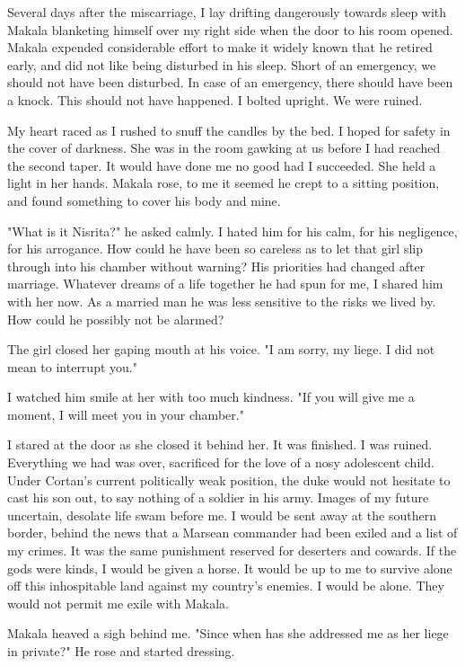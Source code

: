 \documentclass{article}
\begin{document}
Several days after the miscarriage, I lay drifting dangerously towards sleep with Makala blanketing himself over my right side when the door to his room opened. Makala expended considerable effort to make it widely known that he retired early, and did not like being disturbed in his sleep. Short of an emergency, we should not have been disturbed. In case of an emergency, there should have been a knock. This should not have happened. I bolted upright. We were ruined.

My heart raced as I rushed to snuff the candles by the bed. I hoped for safety in the cover of darkness. She was in the room gawking at us before I had reached the second taper. It would have done me no good had I succeeded. She held a light in her hands. Makala rose, to me it seemed he crept to a sitting position, and found something to cover his body and mine.

"What is it Nisrita?" he asked calmly. I hated him for his calm, for his negligence, for his arrogance. How could he have been so careless as to let that girl slip through into his chamber without warning? His priorities had changed after marriage. Whatever dreams of a life together he had spun for me, I shared him with her now. As a married man he was less sensitive to the risks we lived by. How could he possibly not be alarmed?

The girl closed her gaping mouth at his voice. "I am sorry, my liege. I did not mean to interrupt you."

I watched him smile at her with too much kindness. "If you will give me a moment, I will meet you in your chamber."

I stared at the door as she closed it behind her. It was finished. I was ruined. Everything we had was over, sacrificed for the love of a nosy adolescent child. Under Cortan's current politically weak position, the duke would not hesitate to cast his son out, to say nothing of a soldier in his army. Images of my future uncertain, desolate life swam before me. I would be sent away at the southern border, behind the news that a Marsean commander had been exiled and a list of my crimes. It was the same punishment reserved for deserters and cowards. If the gods were kinds, I would be given a horse. It would be up to me to survive alone off this inhospitable land against my country's enemies. I would be alone. They would not permit me exile with Makala.

Makala heaved a sigh behind me. "Since when has she addressed me as her liege in private?" He rose and started dressing.
\end{document}
